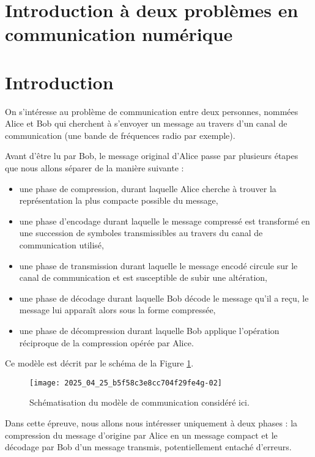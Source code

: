 
\section*{Introduction à deux problèmes en communication numérique}
\section{Introduction}
On s'intéresse au problème de communication entre deux personnes, nommées Alice et Bob qui cherchent à s'envoyer un message au travers d'un canal de communication (une bande de fréquences radio par exemple).

Avant d'être lu par Bob, le message original d'Alice passe par plusieurs étapes que nous allons séparer de la manière suivante :

\begin{itemize}
  \item une phase de compression, durant laquelle Alice cherche à trouver la représentation la plus compacte possible du message,
  \item une phase d'encodage durant laquelle le message compressé est transformé en une succession de symboles transmissibles au travers du canal de communication utilisé,
  \item une phase de transmission durant laquelle le message encodé circule sur le canal de communication et est susceptible de subir une altération,
  \item une phase de décodage durant laquelle Bob décode le message qu'il a reçu, le message lui apparaît alors sous la forme compressée,
  \item une phase de décompression durant laquelle Bob applique l'opération réciproque de la compression opérée par Alice.\\
\end{itemize}

Ce modèle est décrit par le schéma de la Figure \ref{fig_ccmp_2024_info_01}.

\begin{figure}[!h]
\centering
\texttt{[image: 2025\_04\_25\_b5f58c3e8cc704f29fe4g-02]}
\caption{Schématisation du modèle de communication considéré ici.\label{fig_ccmp_2024_info_01}}
\end{figure}

Dans cette épreuve, nous allons nous intéresser uniquement à deux phases : la compression du message d'origine par Alice en un message compact et le décodage par Bob d'un message transmis, potentiellement entaché d'erreurs.

